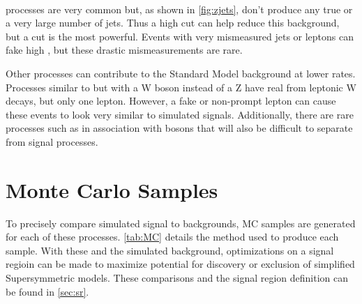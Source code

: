 \paragraph{\dyjets} processes are very common but, as shown in \autoref{fig:zjets}, don't produce any true \MET or a very large number of jets. Thus a high \HT cut can help reduce this background, but a \MET cut is the most powerful. Events with very mismeasured jets or leptons can fake high \MET, but these drastic mismeasurements are rare. 

Other processes can contribute to the Standard Model background at lower rates. Processes similar to \dyjets but with a W boson instead of a Z have real \MET from leptonic W decays, but only one lepton. However, a fake or non-prompt lepton can cause these events to look very similar to simulated signals. Additionally, there are rare processes such as \ttbar in association with bosons that will also be difficult to separate from signal processes.

\section{Monte Carlo Samples} 

To precisely compare simulated signal to backgrounds, \ac{MC} samples are generated for each of these processes. \autoref{tab:MC} details the method used to produce each sample. With these and the simulated background, optimizations on a signal regioin can be made to maximize potential for discovery or exclusion of simplified Supersymmetric models. These comparisons and the signal region definition can be found in \autoref{sec:sr}.

